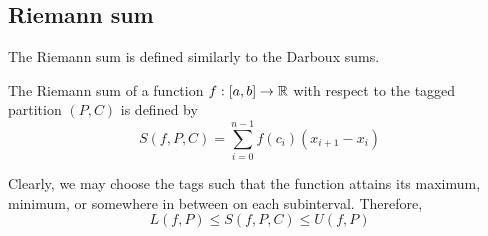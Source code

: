 
\subsection{Riemann sum}
The Riemann sum is defined similarly to the Darboux sums.
\begin{definition}
  The Riemann sum of a function $f: [a, b] \to \mathbb{R}$ with respect to the tagged partition $(P, C)$ is defined by
  \[
    S(f, P, C) = \sum_{i = 0}^{n - 1} f(c_i) (x_{i + 1} - x_i)
  \]
\end{definition}
Clearly, we may choose the tags such that the function attains its maximum, minimum, or somewhere in between on each subinterval. Therefore,
\[
  L(f, P) \leq S(f, P, C) \leq U(f, P)
\]


